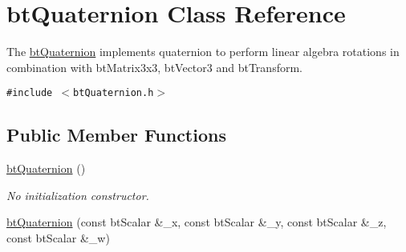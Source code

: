 \hypertarget{classbt_quaternion}{
\section{btQuaternion Class Reference}
\label{classbt_quaternion}
}
The \hyperlink{classbt_quaternion}{btQuaternion} implements quaternion to perform linear algebra rotations in combination with btMatrix3x3, btVector3 and btTransform.  


{\tt \#include $<$btQuaternion.h$>$}

\subsection*{Public Member Functions}
\begin{CompactItemize}
\item 
\hypertarget{classbt_quaternion_3b5e50d610ee8cdda2aa78e092825675}{
\hyperlink{classbt_quaternion_3b5e50d610ee8cdda2aa78e092825675}{btQuaternion} ()}
\label{classbt_quaternion_3b5e50d610ee8cdda2aa78e092825675}

\begin{CompactList}\small\item\em No initialization constructor. \item\end{CompactList}\item 
\hypertarget{classbt_quaternion_6a50bf861ae5fa4ad5ea2b7da231847c}{
\hyperlink{classbt_quaternion_6a50bf861ae5fa4ad5ea2b7da231847c}{btQuaternion} (const btScalar \&\_\-x, const btScalar \&\_\-y, const btScalar \&\_\-z, const btScalar \&\_\-w)}
\label{classbt_quaternion_6a50bf861ae5fa4ad5ea2b7da231847c}


\end{CompactItemize}
